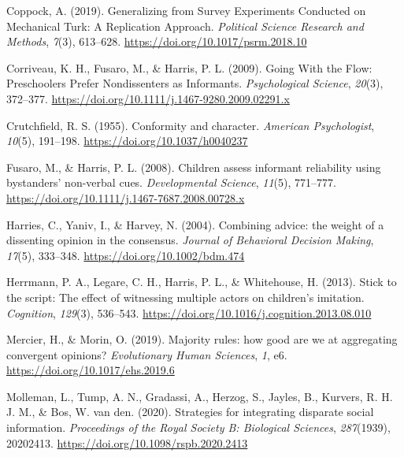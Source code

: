 \documentclass[
  doc,floatsintext]{apa6}
\newlength{\cslhangindent}
\newlength{\cslentryspacingunit} %
\newenvironment{CSLReferences}[2] %
 {%
  \setlength{\parindent}{0pt}
  \ifodd #1
  \let\oldpar\par
  \def\par{\hangindent=\cslhangindent\oldpar}
  \fi
  \setlength{\parskip}{#2\cslentryspacingunit}
 }%
 {}
\begin{document}
\begin{CSLReferences}{1}{0}
\leavevmode{}%
Coppock, A. (2019). Generalizing from Survey Experiments Conducted on Mechanical Turk: A Replication Approach. \emph{Political Science Research and Methods}, \emph{7}(3), 613--628. \url{https://doi.org/10.1017/psrm.2018.10}

\leavevmode{}%
Corriveau, K. H., Fusaro, M., \& Harris, P. L. (2009). Going With the Flow: Preschoolers Prefer Nondissenters as Informants. \emph{Psychological Science}, \emph{20}(3), 372--377. \url{https://doi.org/10.1111/j.1467-9280.2009.02291.x}

\leavevmode{}%
Crutchfield, R. S. (1955). Conformity and character. \emph{American Psychologist}, \emph{10}(5), 191--198. \url{https://doi.org/10.1037/h0040237}

\leavevmode{}%
Fusaro, M., \& Harris, P. L. (2008). Children assess informant reliability using bystanders{'} non-verbal cues. \emph{Developmental Science}, \emph{11}(5), 771--777. \url{https://doi.org/10.1111/j.1467-7687.2008.00728.x}

\leavevmode{}%
Harries, C., Yaniv, I., \& Harvey, N. (2004). Combining advice: the weight of a dissenting opinion in the consensus. \emph{Journal of Behavioral Decision Making}, \emph{17}(5), 333--348. \url{https://doi.org/10.1002/bdm.474}

\leavevmode{}%
Herrmann, P. A., Legare, C. H., Harris, P. L., \& Whitehouse, H. (2013). Stick to the script: The effect of witnessing multiple actors on children{'}s imitation. \emph{Cognition}, \emph{129}(3), 536--543. \url{https://doi.org/10.1016/j.cognition.2013.08.010}

\leavevmode{}%
Mercier, H., \& Morin, O. (2019). Majority rules: how good are we at aggregating convergent opinions? \emph{Evolutionary Human Sciences}, \emph{1}, e6. \url{https://doi.org/10.1017/ehs.2019.6}

\leavevmode{}%
Molleman, L., Tump, A. N., Gradassi, A., Herzog, S., Jayles, B., Kurvers, R. H. J. M., \& Bos, W. van den. (2020). Strategies for integrating disparate social information. \emph{Proceedings of the Royal Society B: Biological Sciences}, \emph{287}(1939), 20202413. \url{https://doi.org/10.1098/rspb.2020.2413}


\end{CSLReferences}
\end{document}
